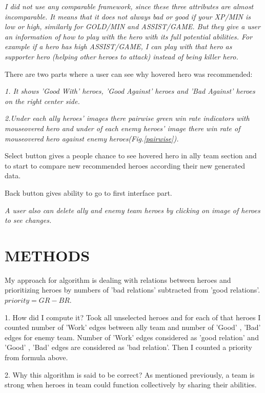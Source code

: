 \documentclass[twocolumn]{autart}    %
\begin{document}
\emph{I did not use any comparable framework, since these three attributes are almost incomparable. It means that it does not always bad or good if your XP/MIN is low or high, similarly for GOLD/MIN and ASSIST/GAME. But they give a user an information of how to play  with the hero with its full potential abilities. For example if a hero has high ASSIST/GAME, I can play with that hero as supporter hero (helping other heroes to attack) instead of being killer hero.}


There are two parts where a user can see why hovered hero was recommended:

\emph{1. It shows 'Good With' heroes, 'Good Against' heroes and 'Bad Against' heroes on the right center side. }
	
\emph{2.Under each ally heroes' images there pairwise green win rate indicators with mouseovered hero and under of each enemy heroes' image there win rate of mouseovered hero against enemy heroes(Fig.\ref{pairwise}).}

Select button gives a people chance to see hovered hero in ally team section and to start to compare new recommended heroes according their new generated data.

Back button gives ability to go to first interface part.

\emph{A user also can delete ally and enemy team heroes by clicking on image of heroes to see changes.}




 
  
					


										
												
\section{METHODS}
My approach for algorithm is dealing with relations between heroes and prioritizing heroes by numbers of 'bad relations' subtracted from 'good relations'. $priority = GR - BR$.

1. How did I compute it? Took all unselected heroes and for each of that heroes I counted number of 'Work' edges between ally team and number of 'Good' , 'Bad' edges for enemy team. Number of 'Work' edges considered as 'good relation' and 'Good' , 'Bad' edges are considered as 'bad relation'. Then I counted a priority from formula above.

2. Why this algorithm is said to be correct? As mentioned previously, a team is strong when heroes in team could function collectively by sharing their abilities.
\end{document}
